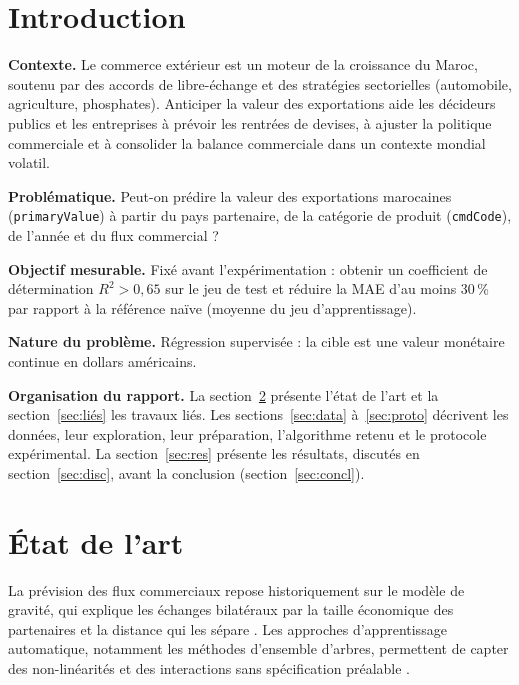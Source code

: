 \documentclass[11pt,a4paper]{article}
\begin{document}
\section{Introduction}
\textbf{Contexte.} Le commerce extérieur est un moteur de la croissance du Maroc, soutenu par des accords de libre-échange et des stratégies sectorielles (automobile, agriculture, phosphates). Anticiper la valeur des exportations aide les décideurs publics et les entreprises à prévoir les rentrées de devises, à ajuster la politique commerciale et à consolider la balance commerciale dans un contexte mondial volatil.

\textbf{Problématique.} Peut-on prédire la valeur des exportations marocaines (\texttt{primaryValue}) à partir du pays partenaire, de la catégorie de produit (\texttt{cmdCode}), de l'année et du flux commercial ?

\textbf{Objectif mesurable.} Fixé avant l'expérimentation : obtenir un coefficient de détermination $R^2>0{,}65$ sur le jeu de test et réduire la MAE d'au moins 30\,\% par rapport à la référence naïve (moyenne du jeu d'apprentissage).

\textbf{Nature du problème.} Régression supervisée : la cible est une valeur monétaire continue en dollars américains.

\textbf{Organisation du rapport.} La section~\ref{sec:eda} présente l'état de l'art et la section~\ref{sec:liés} les travaux liés. Les sections~\ref{sec:data} à~\ref{sec:proto} décrivent les données, leur exploration, leur préparation, l'algorithme retenu et le protocole expérimental. La section~\ref{sec:res} présente les résultats, discutés en section~\ref{sec:disc}, avant la conclusion (section~\ref{sec:concl}).

\section{État de l'art}\label{sec:eda}
La prévision des flux commerciaux repose historiquement sur le modèle de gravité, qui explique les échanges bilatéraux par la taille économique des partenaires et la distance qui les sépare \cite{tinbergen,anderson}. Les approches d'apprentissage automatique, notamment les méthodes d'ensemble d'arbres, permettent de capter des non-linéarités et des interactions sans spécification préalable \cite{breiman}.
\end{document}

